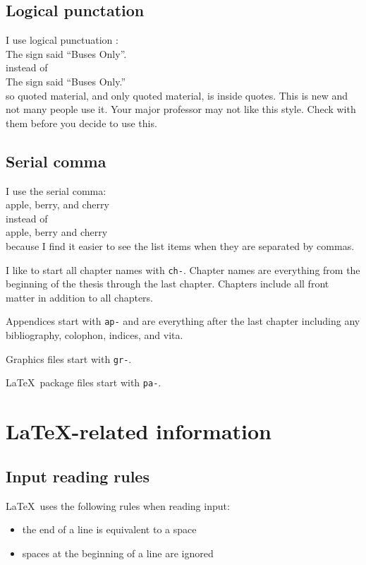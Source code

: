\subsection{Logical punctation}

I use logical punctuation \cite{yagoda2011}:\\
   The sign said ``Buses Only''.\\
instead of\\
   The sign said ``Buses Only.''\\
so quoted material,
and only quoted material,
is inside quotes.
This is new and not many people use it.
Your major professor may not like this style.
Check with them before you decide to use this.


\subsection{Serial comma}

I use the serial comma:\\
   apple, berry, and cherry\\
instead of\\
   apple, berry and cherry\\
because I find it easier
to see the list items
when they are separated by commas.





I like
to start all chapter names with \verb+ch-+.
Chapter names are everything
from the beginning of the thesis through the last chapter.
Chapters include all front matter
in addition to all chapters.

Appendices start with \verb+ap-+ and are everything after the last chapter
including any bibliography,
colophon,
indices,
and vita.

Graphics files start with \verb+gr-+.

\LaTeX\ package files start with \verb+pa-+.


\section{\LaTeX-related information}

\subsection{Input reading rules}

\LaTeX\ uses the following rules when reading input:
\begin{itemize}
  \item the end of a line is equivalent to a space
  \item spaces at the beginning of a line are ignored
\end{itemize}

